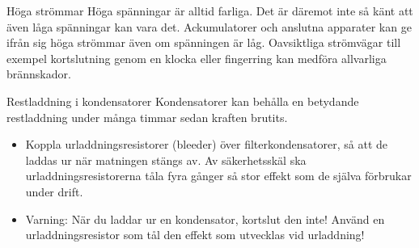 \documentclass{beamer}
\begin{document}
\begin{frame}{Höga strömmar}
Höga spänningar är alltid farliga.
Det är däremot inte så känt att även låga spänningar kan vara det.
Ackumulatorer och anslutna apparater kan ge ifrån sig höga strömmar även om
spänningen är låg.
Oavsiktliga strömvägar till exempel kortslutning genom en klocka eller
fingerring kan medföra allvarliga brännskador.
\end{frame}

\begin{frame}{Restladdning i kondensatorer}
Kondensatorer kan behålla en betydande restladdning under många timmar
sedan kraften brutits.

\begin{itemize}
	\item Koppla urladdningsresistorer (bleeder) över filterkondensatorer,
	så att de laddas ur när matningen stängs av.
	Av säkerhetsskäl ska urladdningsresistorerna tåla fyra gånger så stor effekt
	som de själva förbrukar under drift.
	\item Varning: När du laddar ur en kondensator, kortslut den inte!
	Använd en urladdningsresistor som tål den effekt som utvecklas vid urladdning!
\end{itemize}
\end{frame}
\end{document}
